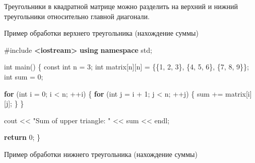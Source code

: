 \documentclass[
]{article}
\newenvironment{Shaded}{}{}
\newcommand{\AttributeTok}[1]{\textcolor[rgb]{0.49,0.56,0.16}{#1}}
\newcommand{\ControlFlowTok}[1]{\textcolor[rgb]{0.00,0.44,0.13}{\textbf{#1}}}
\newcommand{\DataTypeTok}[1]{\textcolor[rgb]{0.56,0.13,0.00}{#1}}
\newcommand{\DecValTok}[1]{\textcolor[rgb]{0.25,0.63,0.44}{#1}}
\newcommand{\ImportTok}[1]{\textcolor[rgb]{0.00,0.50,0.00}{\textbf{#1}}}
\newcommand{\KeywordTok}[1]{\textcolor[rgb]{0.00,0.44,0.13}{\textbf{#1}}}
\newcommand{\NormalTok}[1]{#1}
\newcommand{\OperatorTok}[1]{\textcolor[rgb]{0.40,0.40,0.40}{#1}}
\newcommand{\PreprocessorTok}[1]{\textcolor[rgb]{0.74,0.48,0.00}{#1}}
\newcommand{\StringTok}[1]{\textcolor[rgb]{0.25,0.44,0.63}{#1}}
\begin{document}
Треугольники в квадратной матрице можно разделить на верхний и нижний
треугольники относительно главной диагонали.

Пример обработки верхнего треугольника (нахождение суммы)

\begin{Shaded}
\begin{Highlighting}[]
\PreprocessorTok{\#include }\ImportTok{\textless{}iostream\textgreater{}}
\KeywordTok{using} \KeywordTok{namespace}\NormalTok{ std}\OperatorTok{;}

\DataTypeTok{int}\NormalTok{ main}\OperatorTok{()} \OperatorTok{\{}
    \AttributeTok{const} \DataTypeTok{int}\NormalTok{ n }\OperatorTok{=} \DecValTok{3}\OperatorTok{;}
    \DataTypeTok{int}\NormalTok{ matrix}\OperatorTok{[}\NormalTok{n}\OperatorTok{][}\NormalTok{n}\OperatorTok{]} \OperatorTok{=} \OperatorTok{\{\{}\DecValTok{1}\OperatorTok{,} \DecValTok{2}\OperatorTok{,} \DecValTok{3}\OperatorTok{\},}
                        \OperatorTok{\{}\DecValTok{4}\OperatorTok{,} \DecValTok{5}\OperatorTok{,} \DecValTok{6}\OperatorTok{\},}
                        \OperatorTok{\{}\DecValTok{7}\OperatorTok{,} \DecValTok{8}\OperatorTok{,} \DecValTok{9}\OperatorTok{\}\};}
    \DataTypeTok{int}\NormalTok{ sum }\OperatorTok{=} \DecValTok{0}\OperatorTok{;}

    \ControlFlowTok{for} \OperatorTok{(}\DataTypeTok{int}\NormalTok{ i }\OperatorTok{=} \DecValTok{0}\OperatorTok{;}\NormalTok{ i }\OperatorTok{\textless{}}\NormalTok{ n}\OperatorTok{;} \OperatorTok{++}\NormalTok{i}\OperatorTok{)} \OperatorTok{\{}
        \ControlFlowTok{for} \OperatorTok{(}\DataTypeTok{int}\NormalTok{ j }\OperatorTok{=}\NormalTok{ i }\OperatorTok{+} \DecValTok{1}\OperatorTok{;}\NormalTok{ j }\OperatorTok{\textless{}}\NormalTok{ n}\OperatorTok{;} \OperatorTok{++}\NormalTok{j}\OperatorTok{)} \OperatorTok{\{}
\NormalTok{            sum }\OperatorTok{+=}\NormalTok{ matrix}\OperatorTok{[}\NormalTok{i}\OperatorTok{][}\NormalTok{j}\OperatorTok{];}
        \OperatorTok{\}}
    \OperatorTok{\}}

\NormalTok{    cout }\OperatorTok{\textless{}\textless{}} \StringTok{"Sum of upper triangle: "} \OperatorTok{\textless{}\textless{}}\NormalTok{ sum }\OperatorTok{\textless{}\textless{}}\NormalTok{ endl}\OperatorTok{;}

    \ControlFlowTok{return} \DecValTok{0}\OperatorTok{;}
\OperatorTok{\}}
\end{Highlighting}
\end{Shaded}

Пример обработки нижнего треугольника (нахождение суммы)
\end{document}
